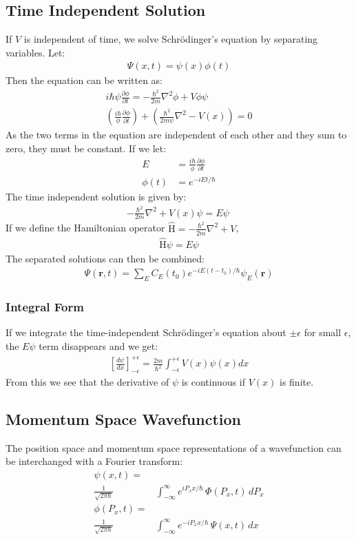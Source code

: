 \documentclass[11pt, letterpaper]{article}
\newcommand{\ve}[1]{
  \ensuremath{\bm{#1}}}	               %
\newcommand{\pd}[2]{
  \ensuremath{
    \frac{\partial #1}{\partial #2} }} %
\newcommand{\operator}[1]{
  \ensuremath{\hat{\text{#1}}}}        %
\begin{document}
\begin{multicols*}{3}
\subsection{Time Independent Solution}
If $V$ is independent of time, we solve Schr\"{o}dinger's equation by separating
variables. Let:
\begin{align*}
  \Psi(x, t) = \psi(x) \phi(t)
\end{align*}
Then the equation can be written as:
\begin{align*}
  i\hbar \psi \pd{\phi}{t} = -\frac{\hbar^2}{2m} \nabla^2 \phi + V \phi \psi \\
  \left( \frac{i\hbar}{\phi} \pd{\phi}{t} \right) + \left(
    \frac{\hbar^2}{2m\psi} \nabla^2 -V(x) \right) = 0
\end{align*}
As the two terms in the equation are independent of each other and they sum to
zero, they must be constant. If we let:
\begin{align*}
  E &= \frac{i\hbar}{\phi} \pd{\phi}{t} \\
  \phi(t) &= e^{-iEt/ \hbar}
\end{align*}
The time independent solution is given by:
\begin{align*}
  -\frac{\hbar^2}{2m}\nabla^2 + V(x) \psi = E \psi\
\end{align*}
If we define the Hamiltonian operator $\operator{H} = -\frac{\hbar^2}{2m}
\nabla^2 + V$,
\begin{align*}
  \operator{H} \psi = E\psi
\end{align*}
The separated solutions can then be combined:
\begin{align*}
  \Psi (\ve{r}, t) = \sum_E C_E(t_0) e^{-iE(t-t_0)/\hbar} \psi_E(\ve{r})
\end{align*}
\subsubsection{Integral Form}
If we integrate the time-independent Schr\"{o}dinger's equation about
$\pm\epsilon$ for small $\epsilon$, the $E\psi$ term disappears and we get:
\begin{align*}
  \left[ \frac{d\psi}{dx} \right]^{+\epsilon}_{-\epsilon} = \frac{2m}{\hbar^2}
  \int^{+\epsilon}_{-\epsilon} V(x) \psi(x) dx
\end{align*}
From this we see that the derivative of $\psi$ is continuous if $V(x)$ is
finite.
\subsection{Momentum Space Wavefunction}
The position space and momentum space representations of a wavefunction can be
interchanged with a Fourier transform:
\begin{align*}
  \psi (x, t) =& \\ \frac{1}{\sqrt{2\pi \hbar}}
  &\int_{-\infty}^\infty e^{iP_xx/\hbar} \, \Phi(P_x, t) \, dP_x \\
  \phi (P_x, t) =& \\ \frac{1}{\sqrt{2\pi \hbar}}
  &\int_{-\infty}^\infty e^{-iP_xx/\hbar} \, \Psi(x, t) \, dx
\end{align*}

\end{multicols*}
\end{document}

